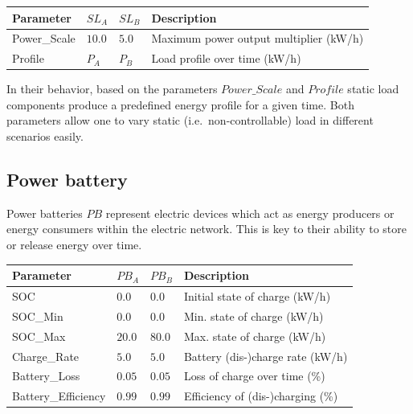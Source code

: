 \begin{table}[h]
	\renewcommand{\arraystretch}{1.3}
	\centering
	\begin{tabularx}{\columnwidth}{lllX}
		\hline
		\textbf{Parameter}              & \textbf{$SL_{A}$}  & \textbf{$SL_{B}$}   & \textbf{Description} \\ \hline
		Power\_Scale                   	  & $10.0$ & $5.0$ & Maximum power output multiplier (kW/h) \\
		Profile                       	  	   & $P_A$ & $P_B$ & Load profile over time  (kW/h)\\ \hline
	\end{tabularx}
\end{table}

In their behavior, based on the parameters $Power\_Scale$ and $Profile$ static load components produce a predefined energy profile for a given time. Both parameters allow one to vary static (i.e.\ non-controllable) load in different scenarios easily.

\subsection{Power battery}

Power batteries $PB$ represent electric devices which act as energy producers or energy consumers within the electric network.
This is key to their ability to store or release energy over time.

\begin{table}[h]
	\renewcommand{\arraystretch}{1.3}
	\centering
	\begin{tabularx}{\columnwidth}{lllX}
		\hline
		\textbf{Parameter}     & \textbf{$PB_{A}$} & \textbf{$PB_{B}$} & \textbf{Description} \\ \hline
		SOC                     & $0.0$ & $0.0$ & Initial state of charge (kW/h)                   \\
		SOC\_Min                & $0.0$ & $0.0$ & Min. state of charge (kW/h)                   \\
		SOC\_Max               & $20.0$ & $80.0$ &  Max. state of charge (kW/h)                    \\
		Charge\_Rate            & $5.0$ & $5.0$ & Battery (dis-)charge rate (kW/h)     \\ 
		Battery\_Loss           & $0.05$ & $0.05$ & Loss of charge over time (\%)\\
		Battery\_Efficiency      & $0.99$ & $0.99$ &Efficiency of (dis-)charging (\%)     \\ \hline
	\end{tabularx}
\end{table}

